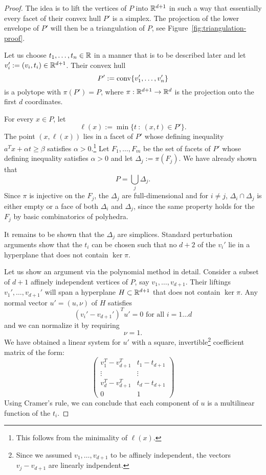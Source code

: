 \begin{proof}
  The idea is to lift the vertices of $P$ into $\mathbb{R}^{d+1}$ in such a way
  that essentially every facet of their convex hull $P'$ is a simplex.
  The projection of the lower envelope of $P'$ will then be a triangulation of $P$,
  see Figure~\ref{fig:triangulation-proof}.

  Let us choose $t_1, \ldots, t_n \in \mathbb{R}$ in a manner that is to be described later
  and let $v_i' := (v_i, t_i) \in \mathbb{R}^{d + 1}$.
  Their convex hull
  \[
    P' := \operatorname{conv}\{v_1',\ldots,v_n'\}
  \]
  is a polytope with $\pi(P') = P$,
  where $\pi:\mathbb{R}^{d+1} \to \mathbb{R}^d$ is the projection onto the first $d$ coordinates.

  For every $x \in P$, let
  \[
    \ell(x) := \min\{ t ~:~ (x,t) \in P' \}.
  \]
  The point $(x, \ell(x))$ lies in a facet of $P'$
  whose defining inequality $a^Tx + \alpha t \geq \beta$ satisfies $\alpha > 0$.\footnote{This follows
  from the minimality of $\ell(x)$.}
  Let $F_1,\ldots,F_m$ be the set of facets of $P'$ whose defining inequality satisfies $\alpha > 0$
  and let $\Delta_j := \pi(F_j)$.
  We have already shown that
  \[
    P = \bigcup_j \Delta_j.
  \]
  Since $\pi$ is injective on the $F_j$, the $\Delta_j$ are full-dimensional
  and for $i \neq j$, $\Delta_i \cap \Delta_j$ is either empty or a face of both $\Delta_i$ and $\Delta_j$,
  since the same property holds for the $F_j$ by basic combinatorics of polyhedra.

  It remains to be shown that the $\Delta_j$ are simplices.
  Standard perturbation arguments show that the $t_i$ can be chosen such that no $d+2$ of the $v_i'$ lie in a hyperplane that does not contain $\ker \pi$.

  Let us show an argument via the polynomial method in detail.
  Consider a subset of $d+1$ affinely independent vertices of $P$, say $v_1, \ldots, v_{d+1}$.
  Their liftings $v_1', \ldots, v_{d+1}'$ will span a hyperplane $H \subset \mathbb{R}^{d+1}$ that does not contain $\ker \pi$.
  Any normal vector $u' = (u,\nu)$ of $H$ satisfies
  \[
    (v_i' - v_{d+1}')^T u' = 0 \text{ for all } i = 1 \ldots d
  \]
  and we can normalize it by requiring
  \[
    \nu = 1.
  \]
  We have obtained a linear system for $u'$ with a square, invertible\footnote{%
  Since we assumed $v_1, \ldots, v_{d+1}$ to be affinely independent, the vectors $v_j - v_{d+1}$ are linearly indpendent.}
  coefficient matrix of the form:
  \[
    \begin{pmatrix}
      v_1^T - v_{d+1}^T & t_1 - t_{d+1} \\
      \vdots & \vdots \\
      v_d^T - v_{d+1}^T & t_d - t_{d+1} \\
      0 & 1
    \end{pmatrix}
  \]
  Using Cramer's rule, we can conclude that each component of $u$ is a multilinear function of the $t_i$.


\end{proof}
